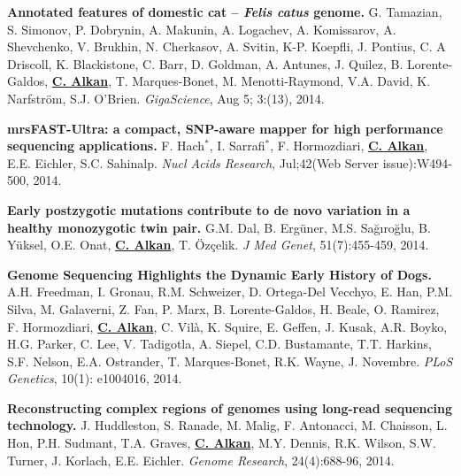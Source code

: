 \documentclass[margin,line]{res}
\begin{document}
\begin{resume}
                                       
  \vspace{-.2cm}        
  {\bf Annotated features of domestic cat – \textit{Felis catus} genome.}
  G. Tamazian, S. Simonov, P. Dobrynin, A. Makunin, A. Logachev, 
  A. Komissarov, A. Shevchenko, V. Brukhin, N. Cherkasov, A. Svitin,
  K-P. Koepfli, J. Pontius, C. A Driscoll, K. Blackistone, C. Barr, 
  D. Goldman, A. Antunes, J. Quilez, B. Lorente-Galdos,  {\bf {\underline {C. Alkan}}},
  T. Marques-Bonet, M. Menotti-Raymond, V.A. David, K. Narfström, S.J. O’Brien.
  {\em GigaScience}, Aug 5; 3:(13), 2014.
                                       
  \vspace{-.2cm}        
  {\bf mrsFAST-Ultra: a compact, SNP-aware mapper for high performance sequencing applications.}
    F. Hach$^*$,
    I. Sarrafi$^*$,
    F. Hormozdiari,
    {\bf {\underline {C. Alkan}}},
    E.E. Eichler,   S.C. Sahinalp.
    {\em Nucl Acids Research}, Jul;42(Web Server issue):W494-500, 2014.

  \vspace{-.2cm}        
         {\bf Early postzygotic mutations contribute to de novo variation in a healthy monozygotic twin pair.}
         G.M. Dal, B. Ergüner, M.S. Sağıroğlu, B. Yüksel, O.E. Onat, {\bf {\underline {C. Alkan}}}, T. Özçelik. 
         {\em J Med Genet}, 51(7):455-459, 2014.

  \vspace{-.2cm}        
         {\bf Genome Sequencing Highlights the Dynamic Early History of Dogs.} 
         A.H. Freedman, I. Gronau, R.M. Schweizer, D. Ortega-Del Vecchyo, E. Han, P.M. Silva, 
         M. Galaverni, Z. Fan, P. Marx, B. Lorente-Galdos, H. Beale, O. Ramirez, F. Hormozdiari, 
         {\bf {\underline {C. Alkan}}}, 
         C. Vilà, K. Squire, E. Geffen, J. Kusak, A.R. Boyko, H.G. Parker, 
         C. Lee, V. Tadigotla, A. Siepel, C.D. Bustamante, T.T. Harkins, S.F. Nelson, 
         E.A. Ostrander, T. Marques-Bonet, R.K. Wayne, J. Novembre. 
         {\em PLoS Genetics}, 10(1): e1004016, 2014.


 \vspace{-.2cm}        
        {\bf Reconstructing complex regions of genomes using long-read sequencing technology.}
         J. Huddleston, S. Ranade, M. Malig, F. Antonacci, M. Chaisson, L. Hon, P.H. Sudmant, T.A. Graves, 
         {\bf {\underline{C. Alkan}}}, M.Y. Dennis, R.K. Wilson, S.W. Turner, J. Korlach, E.E. Eichler. 
         {\em Genome Research},  24(4):688-96, 2014.


\end{resume}
\end{document}
